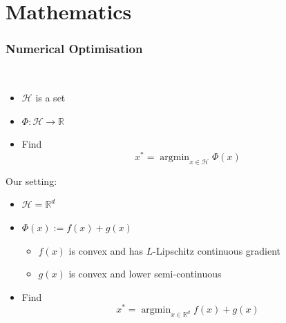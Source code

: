 \documentclass[aspectratio=169]{beamer}
\newcommand{\HH}{\mathcal{H}}
\newcommand{\RR}{\mathbb{R}}
\newcommand{\rd}{\mathbb{R}^d}
\DeclareMathOperator*{\argmin}{argmin}
\begin{document}
	
	\section{Mathematics}
		\setcounter{showSlideNumbers}{1}
		\begin{frame}
			\frametitle{Numerical Optimisation}
			\quad \\
			\begin{itemize}
			\item $\HH$ is a set
			\item $\Phi: \HH\to\RR$
			\item Find \begin{equation}\nonumber x^* = \argmin_{x\in\HH}\Phi(x)\end{equation}
			\end{itemize}
			
			\pause
			\vfill
			
			Our setting:
			\begin{itemize}
			\item $\HH=\rd$
			\item $\Phi(x) := f(x) + g(x)$
				\begin{itemize}
				\item $f(x)$ is convex and has $L$-Lipschitz continuous gradient
				\item $g(x)$ is convex and lower semi-continuous
				\end{itemize}
			\item Find \begin{equation}\nonumber x^* = \argmin_{x\in\rd}f(x)+g(x)\end{equation}
			\end{itemize}
			
		\end{frame}
\end{document}
